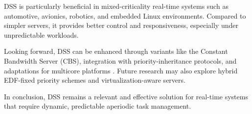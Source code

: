 \documentclass[conference]{IEEEtran}
\begin{document}
DSS is particularly beneficial in mixed-criticality real-time systems such as automotive, avionics, robotics, and embedded Linux environments. Compared to simpler servers, it provides better control and responsiveness, especially under unpredictable workloads.

Looking forward, DSS can be enhanced through variants like the Constant Bandwidth Server (CBS), integration with priority-inheritance protocols, and adaptations for multicore platforms \cite{laplante2011real}. Future research may also explore hybrid EDF-fixed priority schemes and virtualization-aware servers.

In conclusion, DSS remains a relevant and effective solution for real-time systems that require dynamic, predictable aperiodic task management.



\printbibliography


\vspace{12pt}
\color{red}
\end{document}
